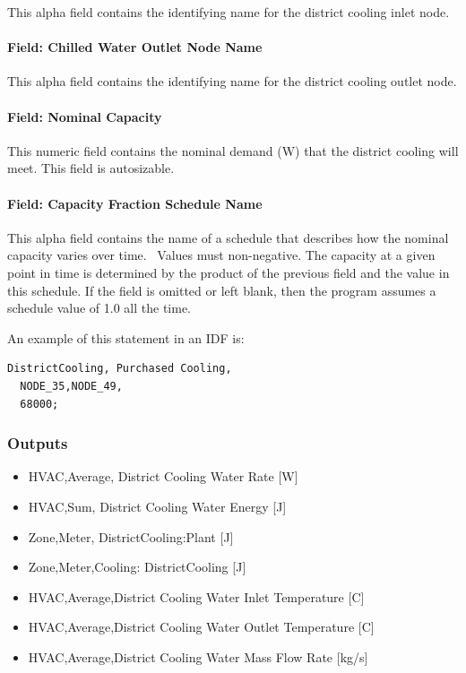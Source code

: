 This alpha field contains the identifying name for the district cooling inlet node.

\paragraph{Field: Chilled Water Outlet Node Name}\label{field-chilled-water-outlet-node-name-10}

This alpha field contains the identifying name for the district cooling outlet node.

\paragraph{Field: Nominal Capacity}\label{field-nominal-capacity-10}

This numeric field contains the nominal demand (W) that the district cooling will meet. This field is autosizable.

\paragraph{Field: Capacity Fraction Schedule Name}\label{field-capacity-fraction-schedule-name}

This alpha field contains the name of a schedule that describes how the nominal capacity varies over time.~ Values must non-negative. The capacity at a given point in time is determined by the product of the previous field and the value in this schedule. If the field is omitted or left blank, then the program assumes a schedule value of 1.0 all the time.

An example of this statement in an IDF is:

\begin{lstlisting}
DistrictCooling, Purchased Cooling,
  NODE_35,NODE_49,
  68000;
\end{lstlisting}

\subsubsection{Outputs}\label{outputs-14-003}

\begin{itemize}
    \item
    HVAC,Average, District Cooling Water Rate {[}W{]}
    \item
    HVAC,Sum, District Cooling Water Energy {[}J{]}
    \item
    Zone,Meter, DistrictCooling:Plant {[}J{]}
    \item
    Zone,Meter,Cooling: DistrictCooling {[}J{]}
    \item
    HVAC,Average,District Cooling Water Inlet Temperature {[}C{]}
    \item
    HVAC,Average,District Cooling Water Outlet Temperature {[}C{]}
    \item
    HVAC,Average,District Cooling Water Mass Flow Rate {[}kg/s{]}
\end{itemize}

